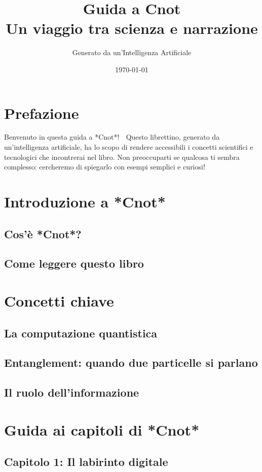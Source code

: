 \documentclass[a4paper,12pt]{book}
\title{Guida a Cnot\\{\small Un viaggio tra scienza e narrazione}}
\author{Generato da un'Intelligenza Artificiale}
\date{\today}
\begin{document}
\maketitle

\chapter*{Prefazione}
Benvenuto in questa guida a *Cnot*! 🚀 Questo librettino, generato da un'intelligenza artificiale, ha lo scopo di rendere accessibili i concetti scientifici e tecnologici che incontrerai nel libro. Non preoccuparti se qualcosa ti sembra complesso: cercheremo di spiegarlo con esempi semplici e curiosi!

\tableofcontents

\chapter{Introduzione a *Cnot*}
\section{Cos'è *Cnot*?}

\section{Come leggere questo libro}

\chapter{Concetti chiave}
\section{La computazione quantistica}


\section{Entanglement: quando due particelle si parlano}


\section{Il ruolo dell'informazione}


\chapter{Guida ai capitoli di *Cnot*}
\section{Capitolo 1: Il labirinto digitale}
\end{document}
